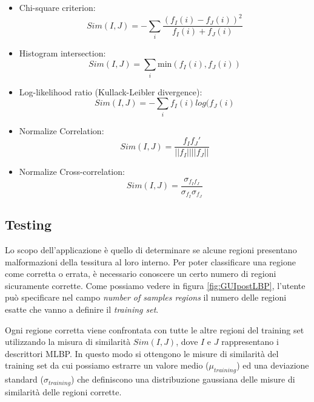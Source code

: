\begin{itemize}

\item Chi-square criterion:
\begin{equation}
Sim(I, J) = -  \sum_{i} \frac{ (f_{I}(i) - f_{J}(i) )^2}{f_{I}(i) + f_{J}(i)}
\end{equation}

\item Histogram intersection:
\begin{equation}
Sim(I, J) = \sum_{i} \mbox{min}(f_{I}(i),f_{J}(i))
\end{equation}

\item Log-likelihood ratio (Kullack-Leibler 
divergence):
\begin{equation}
Sim(I, J) = - \sum_{i} f_{I}(i)log(f_{J}(i)
\end{equation}

\item Normalize Correlation:
\begin{equation}
Sim(I, J) = \frac{f_{I}f_{J}'}{||f_{I}|| ||f_{J}||}
\end{equation}

\item Normalize Cross-correlation:
\begin{equation}
Sim(I, J) = \frac{\sigma_{f_{I}f_{J}}}{\sigma_{f_{I}}\sigma_{f_{J}}}
\end{equation}


\end{itemize}

\pagebreak
\subsection{Testing}

Lo scopo dell'applicazione è quello di determinare se alcune regioni presentano malformazioni della tessitura al loro interno. Per poter classificare una regione come corretta o errata, è necessario conoscere un certo numero di regioni sicuramente corrette. Come possiamo vedere in figura \ref{fig:GUIpostLBP}, l'utente può specificare nel campo \textit{number of samples regions} il numero delle regioni esatte che vanno a definire il \textit{training set}.

Ogni regione corretta viene confrontata con tutte le altre regioni del training set utilizzando la misura di similarità $Sim(I, J)$, dove  $I$ e $J$ rappresentano i descrittori \acs{MLBP}.
In questo modo si ottengono le misure di similarità del training set da cui possiamo estrarre un valore medio ($\mu_{training}$) ed una deviazione standard ($\sigma_{training}$) che definiscono una distribuzione gaussiana delle misure di similarità delle regioni corrette.


